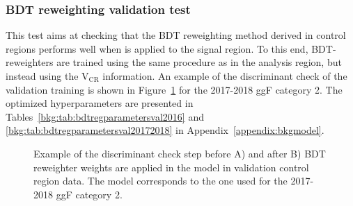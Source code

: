 \subsubsection{BDT reweighting validation test}
This test aims at checking that the BDT reweighting method derived in control regions performs well when is applied to the signal region. To this end, BDT-reweighters are trained using the same procedure as in the analysis region, but instead using the $\mathrm{V_{CR}}$ information. An example of the discriminant check of the validation training is shown in Figure~\ref{fig:bkgclassfiercheckval} for the 2017-2018 ggF category 2. The optimized hyperparameters are presented in Tables~\ref{bkg:tab:bdtregparametersval2016} and \ref{bkg:tab:bdtregparametersval20172018}  in Appendix~\ref{appendix:bkgmodel}.
\begin{figure}[htbp!]
\begin{center}
\captionsetup[subfigure]{justification=centering}
\end{center}
\caption[Example of the discriminant check step in the model for validation control region data]{Example of the discriminant check step before A) and after B) BDT reweighter weights are applied in the model in validation control region data. The model corresponds to the one used for the 2017-2018 ggF category 2.}
\label{fig:bkgclassfiercheckval}
\end{figure}

